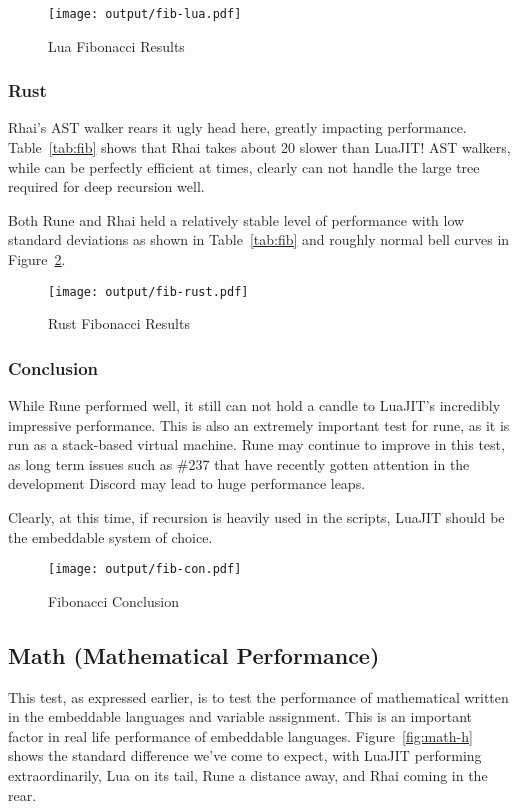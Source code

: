 \begin{figure}[H]
	\centering
		\texttt{[image: output/fib-lua.pdf]}
	\caption{Lua Fibonacci Results}
	\label{fig:fib-lua}
\end{figure}

\subsubsection{Rust}
Rhai's AST walker\cite{rhai:walker} rears it ugly head here, greatly impacting performance. Table~\ref{tab:fib} shows that Rhai takes about 20 slower than LuaJIT! AST walkers, while can be perfectly efficient at times, clearly can not handle the large tree required for deep recursion well.

Both Rune and Rhai held a relatively stable level of performance with low standard deviations as shown in Table~\ref{tab:fib} and roughly normal bell curves in Figure~\ref{fig:fib-rust}.

\begin{figure}[H]
	\centering
		\texttt{[image: output/fib-rust.pdf]}
	\caption{Rust Fibonacci Results}
	\label{fig:fib-rust}
\end{figure}

\subsubsection{Conclusion}
While Rune performed well, it still can not hold a candle to LuaJIT's incredibly impressive performance. This is also an extremely important test for rune, as it is run as a stack-based virtual machine.\cite{rune:stack} Rune may continue to improve in this test, as long term issues such as \#237\cite{rune:JIT} that have recently gotten attention in the development Discord may lead to huge performance leaps.

Clearly, at this time, if recursion is heavily used in the scripts, LuaJIT should be the embeddable system of choice.

\begin{figure}[H]
	\centering
		\texttt{[image: output/fib-con.pdf]}
	\caption{Fibonacci Conclusion}
	\label{fig:fib-con}
\end{figure}

\subsection{Math (Mathematical Performance)} \label{sec:analysis:math}
This test, as expressed earlier, is to test the performance of mathematical written in the embeddable languages and variable assignment. This is an important factor in real life performance of embeddable languages. Figure~\ref{fig:math-h} shows the standard difference we've come to expect, with LuaJIT performing extraordinarily, Lua on its tail, Rune a distance away, and Rhai coming in the rear.

